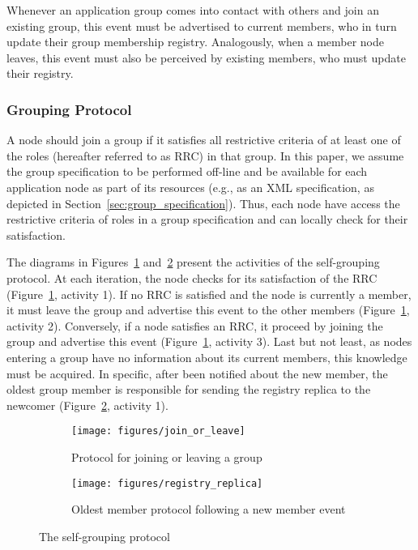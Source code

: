 Whenever an application group comes into contact with others and join an existing group, this event must be  advertised to current members, who in turn update their group membership registry. Analogously, when a member node leaves, this event must also be perceived by existing members, who must update their registry.

\subsubsection{\textbf{Grouping Protocol}} 

A node should join a group if it satisfies all restrictive criteria of at least one of the roles (hereafter referred to as RRC) in that group. In this paper, we assume the group specification to be performed off-line and be available for each application node as part of its resources (e.g., as an XML specification, as depicted in Section~\ref{sec:group_specification}). Thus, each node have access the restrictive criteria of roles in a group specification and can locally check for their satisfaction. 


The diagrams in Figures~\ref{fig:join_or_leave} and~\ref{fig:registry_replica} present the activities of the self-grouping protocol. At each iteration, the node checks for its satisfaction of the RRC (Figure~\ref{fig:join_or_leave}, activity 1). If no RRC is satisfied and the node is currently a member, it must leave the group and advertise this event to the other members (Figure~\ref{fig:join_or_leave}, activity 2). Conversely, if a node satisfies an RRC, it proceed by joining the group and advertise this event (Figure~\ref{fig:join_or_leave}, activity 3). Last but not least, as nodes entering a group have no information about its current members, this knowledge must be acquired. In specific, after been notified about the new member, the oldest group member is responsible for sending the registry replica to the newcomer (Figure~\ref{fig:registry_replica}, activity 1).


\begin{figure}[t!]
	\centering
	\begin{subfigure}[b]{0.45\textwidth}
		\centering
		\texttt{[image: figures/join\_or\_leave]}
		\caption{Protocol for joining or leaving a group}
		\label{fig:join_or_leave}
	\end{subfigure}%
	
	\begin{subfigure}[b]{0.45\textwidth}
		\centering
		\texttt{[image: figures/registry\_replica]}
		\caption{Oldest member protocol following a new member event}
		\label{fig:registry_replica}
	\end{subfigure}
	\caption{The self-grouping protocol}
	\label{fig:self_grouping}
\end{figure}


